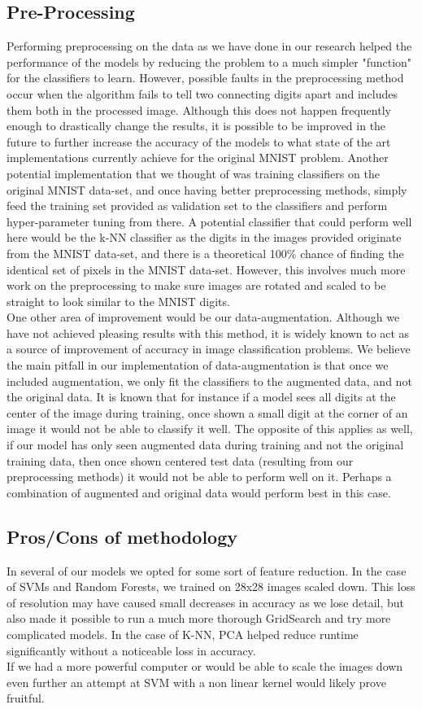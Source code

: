 \documentclass[twoside,twocolumn]{article}
\begin{document}
\subsection{Pre-Processing}
Performing preprocessing on the data as we have done in our research helped the performance of the models by reducing the problem to a much simpler "function" for the classifiers to learn. However, possible faults in the preprocessing method occur when the algorithm fails to tell two connecting digits apart and includes them both in the processed image. Although this does not happen frequently enough to drastically change the results, it is possible to be improved in the future to further increase the accuracy of the models to what state of the art implementations currently achieve for the original MNIST problem. Another potential implementation that we thought of was training classifiers on the original MNIST data-set, and once having better preprocessing methods, simply feed the training set provided as validation set to the classifiers and perform hyper-parameter tuning from there. A potential classifier that could perform well here would be the k-NN classifier as the digits in the images provided originate from the MNIST data-set, and there is a theoretical 100\% chance of finding the identical set of pixels in the MNIST data-set. However, this involves much more work on the preprocessing to make sure images are rotated and scaled to be straight to look similar to the MNIST digits. \\
One other area of improvement would be our data-augmentation. Although we have not achieved pleasing results with this method, it is widely known to act as a source of improvement of accuracy in image classification problems. We believe the main pitfall in our implementation of data-augmentation is that once we included augmentation, we only fit the classifiers to the augmented data, and not the original data. It is known that for instance if a model sees all digits at the center of the image during training, once shown a small digit at the corner of an image it would not be able to classify it well. The opposite of this applies as well, if our model has only seen augmented data during training and not the original training data, then once shown centered test data (resulting from our preprocessing methods) it would not be able to perform well on it. Perhaps a combination of augmented and original data would perform best in this case.
\subsection{Pros/Cons of methodology}
In several of our models we opted for some sort of feature reduction. In the case of SVMs and Random Forests, we trained on 28x28 images scaled down. This loss of resolution may have caused small decreases in accuracy as we lose detail, but also made it possible to run a much more thorough GridSearch and try more complicated models. In the case of K-NN, PCA helped reduce runtime significantly without a noticeable loss in accuracy. \\
If we had a more powerful computer or would be able to scale the images down even further an attempt at SVM with a non linear kernel would likely prove fruitful. 
\end{document}
